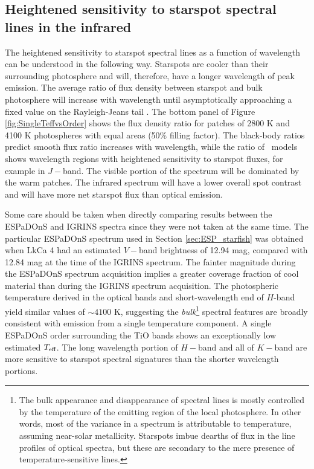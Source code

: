 \documentclass[twocolumn]{emulateapj}%
\begin{document}
\subsection{Heightened sensitivity to starspot spectral lines in the infrared}\label{sec:whyNearIR}

The heightened sensitivity to starspot spectral lines as a function of wavelength can be understood in the following way.  Starspots are cooler than their surrounding photosphere and will, therefore, have a longer wavelength of peak emission.  The average ratio of flux density between starspot and bulk photosphere will increase with wavelength until asymptotically approaching a fixed value on the Rayleigh-Jeans tail \citep{wolk96}.  The bottom panel of Figure \ref{fig:SingleTeffvsOrder} shows the flux density ratio for patches of 2800 K and 4100 K photospheres with equal areas (50\% filling factor).  The black-body ratios predict smooth flux ratio increases with wavelength, while the ratio of \PHOENIX\ models shows wavelength regions with heightened sensitivity to starspot fluxes, for example in $J-$band.  The visible portion of the spectrum will be dominated by the warm patches.  The infrared spectrum will have a lower overall spot contrast and will have more net starspot flux than optical emission.

Some care should be taken when directly comparing results between the ESPaDOnS and IGRINS spectra since they were not taken at the same time.  The particular ESPaDOnS spectrum used in Section \ref{sec:ESP_starfish} was obtained when LkCa 4 had an estimated $V-$band brightness of 12.94 mag, compared with 12.84 mag at the time of the IGRINS spectrum.  The fainter magnitude during the ESPaDOnS spectrum acquisition implies a greater coverage fraction of cool material than during the IGRINS spectrum acquisition.  
The photospheric temperature derived in the optical bands and short-wavelength end of $H$-band yield similar values of $\sim 4100$ K, suggesting the \emph{bulk}\footnote{The bulk appearance and disappearance of spectral lines is mostly controlled by the temperature of the emitting region of the local photosphere.  In other words, most of the variance in a spectrum is attributable to temperature, assuming near-solar metallicity. 
Starspots imbue dearths of flux in the line profiles of optical spectra, but these are secondary to the mere presence of temperature-sensitive lines.} spectral features are broadly consistent with emission from a single temperature component. A single ESPaDOnS order surrounding the TiO bands shows an exceptionally low estimated $T_\textrm{eff}$.  The long wavelength portion of $H-$band and all of $K-$band are more sensitive to starspot spectral signatures than the shorter wavelength portions.
\end{document}
